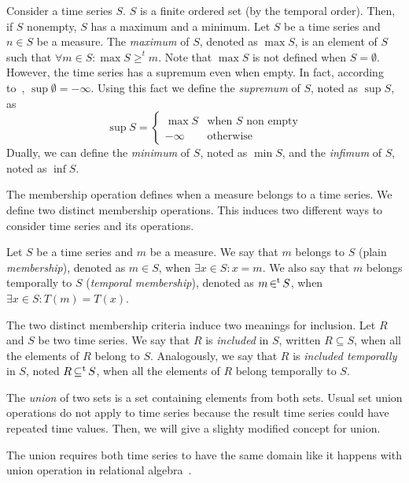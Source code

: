 Consider a time series $S$. $S$ is a finite ordered set (by the
temporal order). Then, if $S$ nonempty, $S$ has a maximum and a
minimum.  
%
Let $S$ be a time series and $n\in S$ be a measure. The \emph{maximum}
of $S$, denoted as $\max S$, is an element of $S$ such that $\forall m
\in S:\max S\geq^t m $.  
%
Note that $\max S$ is not defined when $S=\emptyset$. However, the
time series has a supremum even when empty. In fact, according
to~\cite{cantrell:extendedreal}, $\sup \emptyset=-\infty$.
%
Using this fact we define the \emph{supremum} of $S$, noted as
$\sup S$, as
\[
\sup S =\begin{cases}
  \max S    & \text{when $S$ non empty}\\
  -\infty   & \text{otherwise}
\end{cases}
\]
Dually, we can define the \emph{minimum} of $S$, noted as $\min S$,
and the \emph{infimum} of $S$, noted as $\inf S$.

The membership operation defines when a measure belongs to a time
series. We define two distinct membership operations. This induces two
different ways to consider time series and its operations.

Let $S$ be a time series and $m$ be a measure. 
%
We say that $m$ belongs to $S$ (plain \emph{membership}), denoted as
$m \in S$, when $\exists x\in S: x=m$.  We also say that $m$ belongs
temporally to $S$ (\emph{temporal membership}), denoted as $m \operatorname*{\in^t}
S$, when $\exists x\in S : T(m)=T(x)$.


The two distinct membership criteria induce two meanings for
inclusion. Let $R$ and $S$ be two time series.  We say that $R$ is
\emph{included} in $S$, written $R\subseteq S$, when all the elements
of $R$ belong to $S$.  Analogously, we say that $R$ is \emph{included
  temporally} in $S$, noted $R\operatorname*{\subseteq^t} S$, when all the elements of
$R$ belong temporally to $S$.


The \emph{union} of two sets is a set containing elements from both
sets. Usual set union operations do not apply to time series because
the result time series could have repeated time values.  Then, we will
give a slighty modified concept for union.

The union requires both time series to have the same domain like it
happens with union operation in relational
algebra~\cite{date:introduction}.

